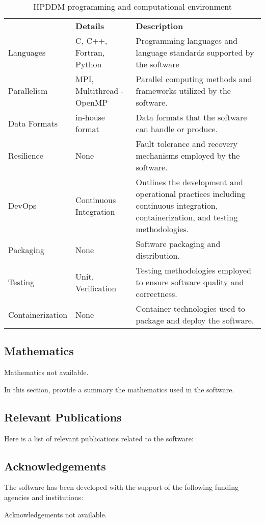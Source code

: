 \begin{table}[h!]
    \centering
    {
    \setlength{\parindent}{0pt}
    \def\arraystretch{1.25}
    {\fontsize{9}{11}\selectfont
    \begin{tabular}{lp{}p{}}
        \rowcolor{numpexgray}{\rule{0pt}{2.5ex}\color{white}\bf Category}  & {\rule{0pt}{2.5ex}\color{white}\bf Details} & {\rule{0pt}{2.5ex}\color{white}\bf Description}\\
        \rowcolor{white}Languages  & C,
C++,
Fortran,
Python & Programming languages and language standards supported by the software \\
        \rowcolor{numpexlightergray}Parallelism  & MPI,
Multithread - OpenMP & Parallel computing methods and frameworks utilized by the software.\\
        \rowcolor{white}Data Formats  & in-house format & Data formats that the software can handle or produce.\\
        \rowcolor{numpexlightergray}Resilience  & None & Fault tolerance and recovery mechanisms employed by the software.\\
        \rowcolor{white}DevOps & Continuous Integration & Outlines the development and operational practices including continuous integration, containerization, and testing methodologies.  \\
        \rowcolor{numpexlightergray}Packaging  & None & Software packaging and distribution.\\
        \rowcolor{white}Testing  & Unit, Verification & Testing methodologies employed to ensure software quality and correctness.\\
        \rowcolor{numpexlightergray}Containerization  & None & Container technologies used to package and deploy the software.\\
        \bottomrule
    \end{tabular}
    }}
    \caption{HPDDM programming and computational environment}
\end{table}



\subsection{Mathematics}
\label{sec:HPDDM:mathematics}
Mathematics not available.

In this section, provide a summary the mathematics used in the software.


\subsection{Relevant Publications}
\label{sec:HPDDM:publications}

Here is a list of relevant publications related to the software:


\subsection{Acknowledgements}
\label{sec::HPDDM:acknowledgements}

The software has been developed with the support of the following funding agencies and institutions: 




Acknowledgements not available.



